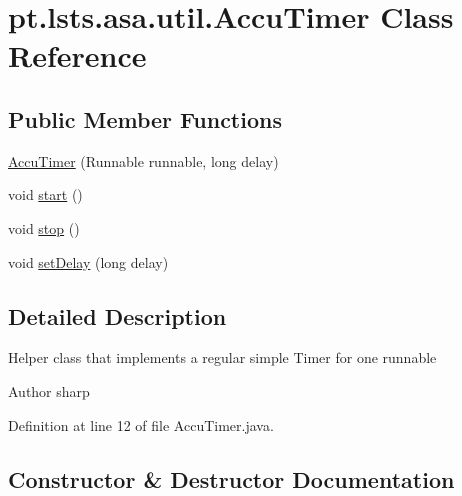 \hypertarget{classpt_1_1lsts_1_1asa_1_1util_1_1AccuTimer}{}\section{pt.\+lsts.\+asa.\+util.\+Accu\+Timer Class Reference}
\label{classpt_1_1lsts_1_1asa_1_1util_1_1AccuTimer}
\subsection*{Public Member Functions}
\begin{DoxyCompactItemize}
\item 
\hyperlink{classpt_1_1lsts_1_1asa_1_1util_1_1AccuTimer_a629d5089ed079254e802f49250ccc7c5}{Accu\+Timer} (Runnable runnable, long delay)
\item 
void \hyperlink{classpt_1_1lsts_1_1asa_1_1util_1_1AccuTimer_a2d29d9a34cc71e0dc813687a472c4e4b}{start} ()
\item 
void \hyperlink{classpt_1_1lsts_1_1asa_1_1util_1_1AccuTimer_a3e860c79811b5b083ae4adc8ba087650}{stop} ()
\item 
void \hyperlink{classpt_1_1lsts_1_1asa_1_1util_1_1AccuTimer_aa5495628026d5197de8f0a4504fe2aef}{set\+Delay} (long delay)
\end{DoxyCompactItemize}


\subsection{Detailed Description}
Helper class that implements a regular simple Timer for one runnable

\begin{DoxyAuthor}{Author}
sharp 
\end{DoxyAuthor}


Definition at line 12 of file Accu\+Timer.\+java.



\subsection{Constructor \& Destructor Documentation}
\hypertarget{classpt_1_1lsts_1_1asa_1_1util_1_1AccuTimer_a629d5089ed079254e802f49250ccc7c5}{}
